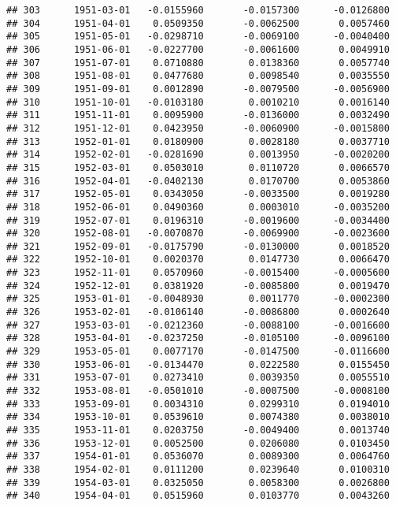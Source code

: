 \documentclass[
]{article}
\begin{document}
\begin{verbatim}
## 303      1951-03-01   -0.0155960       -0.0157300      -0.0126800
## 304      1951-04-01    0.0509350       -0.0062500       0.0057460
## 305      1951-05-01   -0.0298710       -0.0069100      -0.0040400
## 306      1951-06-01   -0.0227700       -0.0061600       0.0049910
## 307      1951-07-01    0.0710880        0.0138360       0.0057740
## 308      1951-08-01    0.0477680        0.0098540       0.0035550
## 309      1951-09-01    0.0012890       -0.0079500      -0.0056900
## 310      1951-10-01   -0.0103180        0.0010210       0.0016140
## 311      1951-11-01    0.0095900       -0.0136000       0.0032490
## 312      1951-12-01    0.0423950       -0.0060900      -0.0015800
## 313      1952-01-01    0.0180900        0.0028180       0.0037710
## 314      1952-02-01   -0.0281690        0.0013950      -0.0020200
## 315      1952-03-01    0.0503010        0.0110720       0.0066570
## 316      1952-04-01   -0.0402130        0.0170700       0.0053860
## 317      1952-05-01    0.0343050       -0.0033500       0.0019280
## 318      1952-06-01    0.0490360        0.0003010      -0.0035200
## 319      1952-07-01    0.0196310       -0.0019600      -0.0034400
## 320      1952-08-01   -0.0070870       -0.0069900      -0.0023600
## 321      1952-09-01   -0.0175790       -0.0130000       0.0018520
## 322      1952-10-01    0.0020370        0.0147730       0.0066470
## 323      1952-11-01    0.0570960       -0.0015400      -0.0005600
## 324      1952-12-01    0.0381920       -0.0085800       0.0019470
## 325      1953-01-01   -0.0048930        0.0011770      -0.0002300
## 326      1953-02-01   -0.0106140       -0.0086800       0.0002640
## 327      1953-03-01   -0.0212360       -0.0088100      -0.0016600
## 328      1953-04-01   -0.0237250       -0.0105100      -0.0096100
## 329      1953-05-01    0.0077170       -0.0147500      -0.0116600
## 330      1953-06-01   -0.0134470        0.0222580       0.0155450
## 331      1953-07-01    0.0273410        0.0039350       0.0055510
## 332      1953-08-01   -0.0501010       -0.0007500      -0.0008100
## 333      1953-09-01    0.0034310        0.0299310       0.0194010
## 334      1953-10-01    0.0539610        0.0074380       0.0038010
## 335      1953-11-01    0.0203750       -0.0049400       0.0013740
## 336      1953-12-01    0.0052500        0.0206080       0.0103450
## 337      1954-01-01    0.0536070        0.0089300       0.0064760
## 338      1954-02-01    0.0111200        0.0239640       0.0100310
## 339      1954-03-01    0.0325050        0.0058300       0.0026800
## 340      1954-04-01    0.0515960        0.0103770       0.0043260

\end{verbatim}
\end{document}

